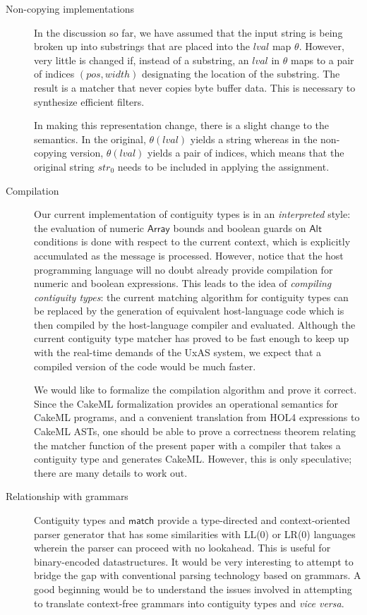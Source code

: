 \documentclass[a4paper,UKenglish,cleveref, autoref, thm-restate]{lipics-v2021}
\newcommand{\konst}[1]{\ensuremath{\mathsf{#1}}}
\newcommand{\lval}{\ensuremath{\mathit{lval}}}
\begin{document}
\begin{description}
\item [Non-copying implementations] In the discussion so far, we have
  assumed that the input string is being broken up into substrings
  that are placed into the \lval{} map $\theta$. However, very little
  is changed if, instead of a substring, an \lval{} in $\theta$ maps
  to a pair of indices $(\mathit{pos},\mathit{width})$ designating the
  location of the substring. The result is a matcher that never copies
  byte buffer data. This is necessary to synthesize efficient filters.

  In making this representation change, there is a slight change to
  the semantics. In the original, $\theta(\lval)$ yields a string
  whereas in the non-copying version, $\theta(\lval)$ yields a pair of
  indices, which means that the original string $\mathit{str}_0$ needs
  to be included in applying the assignment.

\item [Compilation] Our current implementation of contiguity types is
  in an \emph{interpreted} style: the evaluation of numeric
  \konst{Array} bounds and boolean guards on \konst{Alt} conditions is
  done with respect to the current context, which is explicitly
  accumulated as the message is processed. However, notice that the
  host programming language will no doubt already provide compilation
  for numeric and boolean expressions. This leads to the idea of
  \emph{compiling contiguity types}: the current matching algorithm
  for contiguity types can be replaced by the generation of equivalent
  host-language code which is then compiled by the host-language
  compiler and evaluated. Although the current contiguity type matcher
  has proved to be fast enough to keep up with the real-time demands
  of the UxAS system, we expect that a compiled version of the code
  would be much faster.

 We would like to formalize the compilation algorithm and prove it
 correct. Since the CakeML\cite{cakeml:popl14} formalization provides
 an operational semantics for CakeML programs, and a convenient
 translation from HOL4 expressions to CakeML ASTs, one should be able
 to prove a correctness theorem relating the matcher function of the
 present paper with a compiler that takes a contiguity type and
 generates CakeML. However, this is only speculative; there are many
 details to work out.

\item [Relationship with grammars]

Contiguity types and \konst{match} provide a type-directed and
context-oriented parser generator that has some similarities with
LL(0) or LR(0) languages wherein the parser can proceed with no
lookahead. This is useful for binary-encoded datastructures. It would
be very interesting to attempt to bridge the gap with conventional
parsing technology based on grammars. A good beginning would be to
understand the issues involved in attempting to translate context-free
grammars into contiguity types and \emph{vice versa}.

\end{description}
\end{document}
